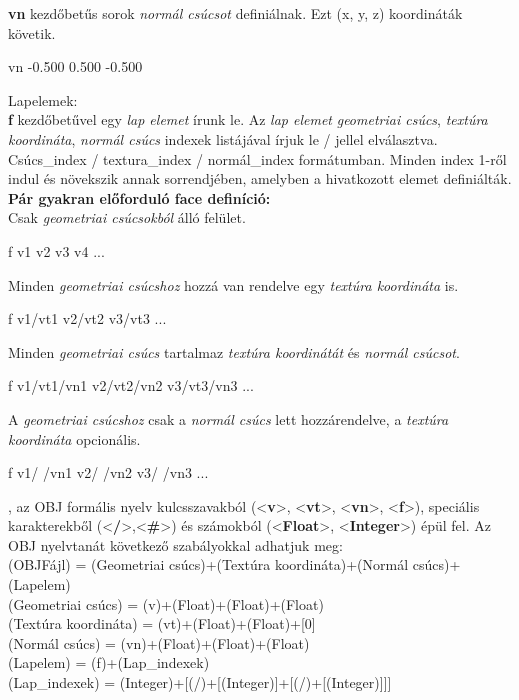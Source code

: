 \noindent \textbf{vn} kezdőbetűs sorok \textsl{normál csúcsot} definiálnak. Ezt  (x, y, z) koordináták követik.
\bigskip
\begin{python} 
vn -0.500 0.500 -0.500
\end{python}
\bigskip
Lapelemek:\\

\noindent \textbf{f} kezdőbetűvel egy \textsl{lap elemet} írunk le. Az \textsl{lap elemet} \textsl{geometriai csúcs}, \textsl{textúra koordináta}, \textsl{normál csúcs} indexek listájával írjuk le {/} jellel elválasztva. Csúcs{\_}index {/} textura{\_}index {/}  normál{\_}index formátumban. Minden index 1-ről indul és növekszik annak sorrendjében, amelyben a hivatkozott elemet definiálták.\\

\noindent \textbf{Pár gyakran előforduló face definíció:}\\

\noindent Csak \textsl{geometriai csúcsokból} álló felület.
\bigskip
\begin{python} 
f v1 v2 v3 v4 ...
\end{python}
\bigskip
 Minden \textsl{geometriai csúcshoz} hozzá van rendelve egy \textsl{textúra koordináta} is.
\begin{python} 
f v1/vt1 v2/vt2 v3/vt3 ...
\end{python}
\bigskip
Minden \textsl{geometriai csúcs} tartalmaz \textsl{textúra koordinátát} és \textsl{normál csúcsot}.
\bigskip
\begin{python} 
f v1/vt1/vn1 v2/vt2/vn2 v3/vt3/vn3 ...
\end{python}
\bigskip
A \textsl{geometriai csúcshoz} csak a \textsl{normál csúcs} lett hozzárendelve, a \textsl{textúra koordináta} opcionális.
\bigskip
\begin{python} 
f v1/ /vn1 v2/ /vn2 v3/ /vn3 ...
\end{python}
\newpage
{}, az OBJ formális nyelv kulcsszavakból (<\textbf{v}>, <\textbf{vt}>, <\textbf{vn}>, <\textbf{f}>), speciális karakterekből (<\textbf{/}>,<\textbf{\#}>) és számokból (<\textbf{Float}>, <\textbf{Integer}>) épül fel. Az OBJ nyelvtanát következő szabályokkal adhatjuk meg:\\

\noindent(OBJFájl) = {(Geometriai csúcs)}+{(Textúra koordináta)}+{(Normál csúcs)}+{(Lapelem)}\\
(Geometriai csúcs) = (v)+(Float)+(Float)+(Float)\\
(Textúra koordináta) = (vt)+(Float)+(Float)+[0]\\
(Normál csúcs) = (vn)+(Float)+(Float)+(Float)\\
(Lapelem) = (f)+{(Lap{\_}indexek)}\\
(Lap{\_}indexek) = (Integer)+[(/)+[(Integer)]+[(/)+[(Integer)]]]\\

